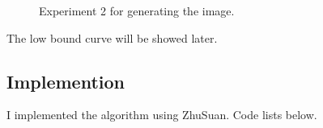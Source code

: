 \documentclass[a4paper]{article}
\begin{document}
\begin{landscape}
\begin{figure}
\caption{Experiment 2 for generating the image.}
\end{figure}
\end{landscape}

The low bound curve will be showed later.

\subsection{Implemention}

 I implemented the algorithm using ZhuSuan. Code lists below.\\
\end{document}

